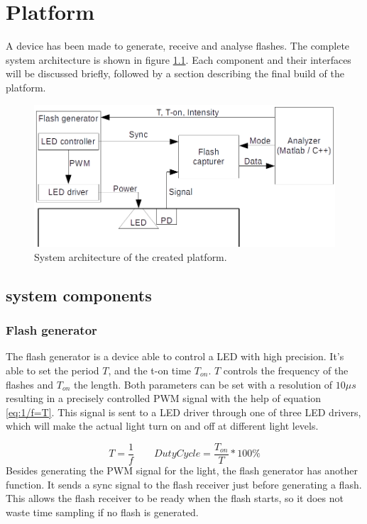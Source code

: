 \chapter{Platform}
\label{chp:Platform}
A device has been made to generate, receive and analyse flashes. The complete system architecture is shown in figure \ref{fig:systemOveriew}. Each component and their interfaces will be discussed briefly, followed by a section describing the final build of the platform.

\begin{figure}[h]
	\includegraphics[width=\textwidth]{pics/systemOverview.png}
	\caption{System architecture of the created platform.\label{fig:systemOveriew}}
\end{figure}

\section{system components}

\subsection{Flash generator}
The flash generator is a device able to control a LED with high precision. It's able to set the period $T$, and the t-on time $T_{on}$. $T$ controls the frequency of the flashes and $T_{on}$ the length. Both parameters can be set with a resolution of $10\mu s$ resulting in a precisely controlled PWM signal with the help of equation \ref{eq:1/f=T}. This signal is sent to a LED driver through one of three LED drivers, which will make the actual light turn on and off at different light levels.

\begin{equation}
\label{eq:1/f=T}
T=\frac{1}{f}
\qquad
DutyCycle=\frac{T_{on}}{T} * 100\%
\end{equation}
Besides generating the PWM signal for the light, the flash generator has another function. It sends a sync signal to the flash receiver just before generating a flash. This allows the flash receiver to be ready when the flash starts, so it does not waste time sampling if no flash is generated.

